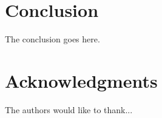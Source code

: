 \documentclass[10pt,a4paper]{article}
\newcommand\1{\vec 1}
\begin{document}
\section{Conclusion}
The conclusion goes here.






%



\section*{Acknowledgments}

The authors would like to thank...




\end{document}
